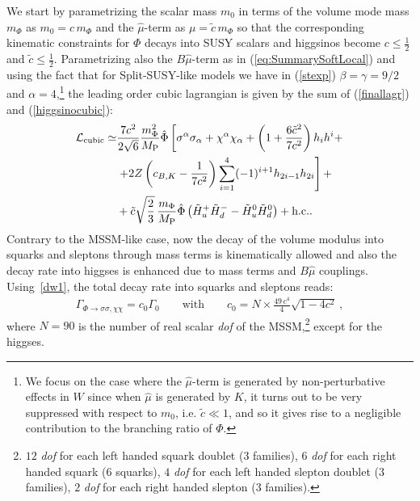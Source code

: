 \documentclass[12pt,a4paper]{book}
\def\nn{\nonumber}
\def\nn{\nonumber}
\newcommand{\mc}{\mathcal}
\begin{document}
We start by parametrizing the scalar mass $m_0$ in terms of the volume mode mass $m_\Phi$ as $m_0 = c \,m_\Phi$ and the $\hat\mu$-term as $\mu = \tilde{c}\,m_\Phi$ so that the corresponding kinematic constraints for $\Phi$ decays into SUSY scalars and higgsinos become $c \leq \frac 12$ and $\tilde{c}\leq \frac 12$.
Parametrizing also the $B\hat\mu$-term as in (\ref{eq:SummarySoftLocal}) and using the fact that for Split-SUSY-like models we have in (\ref{stexp}) $\beta = \gamma = 9/2$ and $\alpha = 4$,\footnote{We focus on the case where the $\hat\mu$-term is generated by non-perturbative effects in $W$ since when $\hat\mu$ is generated by $K$, it turns out to be very suppressed with respect to $m_0$, i.e. $\tilde{c}\ll 1$, and so it gives rise to a negligible contribution to the branching ratio of $\Phi$.} the leading order cubic lagrangian is given by the sum of (\ref{finallagr}) and (\ref{higgsinocubic}):
\begin{align}
\mc{L}_{\rm cubic} \simeq &\frac{7 c^2}{2\sqrt{6}}\frac{m_\Phi^2}{M_{\rm P}} \hat\Phi\left[  
\sigma^\alpha\sigma_\alpha + \chi^\alpha\chi_\alpha+\left(1+\frac{6\tilde{c}^2}{7 c^2}\right)h_i h^i+ \right.\nn \\
&\left.+ 2Z  \left(c_{B,K}  - \frac{1}{7 c^2} \right) \sum_{i=1}^4 (-1)^{i+1}h_{2i-1}h_{2i}\right] +\nn \\	
&+ \tilde{c}\sqrt{\frac 23} \, \frac{m_\Phi}{M_{\rm P}}\hat\Phi \left(\tilde{H}_u^+\tilde{H}_d^- -\tilde{H}_u^0\tilde{H}_d^0\right)+\text{h.c.}.
\label{intlagr}
\end{align}
Contrary to the MSSM-like case, now the decay of the volume modulus into squarks and sleptons through mass terms is kinematically allowed and also the decay rate into higgses is enhanced due to mass terms and $B\hat\mu$ couplings. Using~\eqref{dw1}, the total decay rate into squarks and sleptons reads:
\begin{align}
\Gamma_{\Phi \rightarrow \sigma\sigma,\chi\chi} = c_0 \Gamma_0\qquad\text{with}\qquad c_0 = N\times \frac{49 \, c^4}{4} \sqrt{1 - 4 c^2}\,, 
\end{align}
where $N=90$ is the number of real scalar \textit{dof} of the MSSM,\footnote{$12$ \textit{dof} for each left handed squark doublet ($3$ families), $6$ \textit{dof} for each right handed squark ($6$ squarks), $4$ \textit{dof} for each left handed slepton doublet ($3$ families), $2$ \textit{dof} for each right handed slepton ($3$ families).} except for the higgses.
\end{document}
